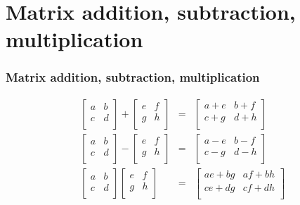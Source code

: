 \documentclass[]{beamer}
\newcommand{\sect}[1]{
\section{#1}
\begin{frame}[fragile]\frametitle{#1}
}
\begin{document}
\sect{Matrix addition, subtraction, multiplication}
\begin{eqnarray*}
\left[\begin{array}{cc}
a & b \\
c & d \\
\end{array}
\right]
+
\left[\begin{array}{cc}
e & f \\
g & h \\
\end{array}
\right]
&=&\left[\begin{array}{cc}
a+e & b+f \\
c+g & d+h \\
\end{array}
\right]\\
\left[\begin{array}{cc}
a & b \\
c & d \\
\end{array}
\right]
-
\left[\begin{array}{cc}
e & f \\
g & h \\
\end{array}
\right]
&=&\left[\begin{array}{cc}
a-e & b-f \\
c-g & d-h \\
\end{array}
\right]\\
\left[\begin{array}{cc}
a & b \\
c & d \\
\end{array}
\right]
\left[\begin{array}{cc}
e & f \\
g & h \\
\end{array}
\right]
&=&\left[\begin{array}{cc}
ae+bg & af+bh \\
ce+dg & cf+dh \\
\end{array}
\right]
\end{eqnarray*}
\end{frame}
\end{document}
